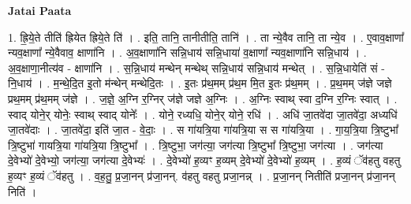 \documentclass[17pt]{extarticle}
\begin{document}
\textbf{Jatai Paata} \newline

1. ह्रि॒ये॒ते तीति॑ ह्रियेत ह्रिये॒ते ति॑ । . इति॒ तानि॒ तानीतीति॒ तानि॑ । . ता न्ये॒वैव तानि॒ ता न्ये॒व । . ए॒वाव॒क्षाणा᳚ न्यव॒क्षाणा᳚ न्ये॒वैवाव॒ क्षाणा॑नि । . अ॒व॒क्षाणा॑नि सन्नि॒धाय॑ सन्नि॒धाया॑ व॒क्षाणा᳚ न्यव॒क्षाणा॑नि सन्नि॒धाय॑ । . अ॒व॒क्षाणा॒नीत्य॑व - क्षाणा॑नि । . स॒न्नि॒धाय॑ मन्थेन् मन्थेथ् सन्नि॒धाय॑ सन्नि॒धाय॑ मन्थेत् । . स॒न्नि॒धायेति॑ सं - नि॒धाय॑ । . म॒न्थे॒दि॒त इ॒तो म॑न्थेन् मन्थेदि॒तः । . इ॒तः प्र॑थ॒मम् प्र॑थ॒म मि॒त इ॒तः प्र॑थ॒मम् । . प्र॒थ॒मम् ज॑ज्ञे जज्ञे प्रथ॒मम् प्र॑थ॒मम् ज॑ज्ञे । . ज॒ज्ञे॒ अ॒ग्नि र॒ग्निर् ज॑ज्ञे जज्ञे अ॒ग्निः । . अ॒ग्निः स्वाथ् स्वा द॒ग्नि र॒ग्निः स्वात् । . स्वाद् योने॒र् योनेः॒ स्वाथ् स्वाद् योनेः᳚ । . योने॒ रध्यधि॒ योने॒र् योने॒ रधि॑ । . अधि॑ जा॒तवे॑दा जा॒तवे॑दा॒ अध्यधि॑ जा॒तवे॑दाः । . जा॒तवे॑दा॒ इति॑ जा॒त - वे॒दाः॒ । . स गा॑यत्रि॒या गा॑यत्रि॒या स स गा॑यत्रि॒या । . गा॒य॒त्रि॒या त्रि॒ष्टुभा᳚ त्रि॒ष्टुभा॑ गायत्रि॒या गा॑यत्रि॒या त्रि॒ष्टुभा᳚ । . त्रि॒ष्टुभा॒ जग॑त्या॒ जग॑त्या त्रि॒ष्टुभा᳚ त्रि॒ष्टुभा॒ जग॑त्या । . जग॑त्या दे॒वेभ्यो॑ दे॒वेभ्यो॒ जग॑त्या॒ जग॑त्या दे॒वेभ्यः॑ । . दे॒वेभ्यो॑ ह॒व्यꣳ ह॒व्यम् दे॒वेभ्यो॑ दे॒वेभ्यो॑ ह॒व्यम् । . ह॒व्यं ॅव॑हतु वहतु ह॒व्यꣳ ह॒व्यं ॅव॑हतु । . व॒ह॒तु॒ प्र॒जा॒नन् प्र॑जा॒नन्. व॑हतु वहतु प्रजा॒नन्न् । . प्र॒जा॒नन् नितीति॑ प्रजा॒नन् प्र॑जा॒नन् निति॑ । \newline
\end{document}
